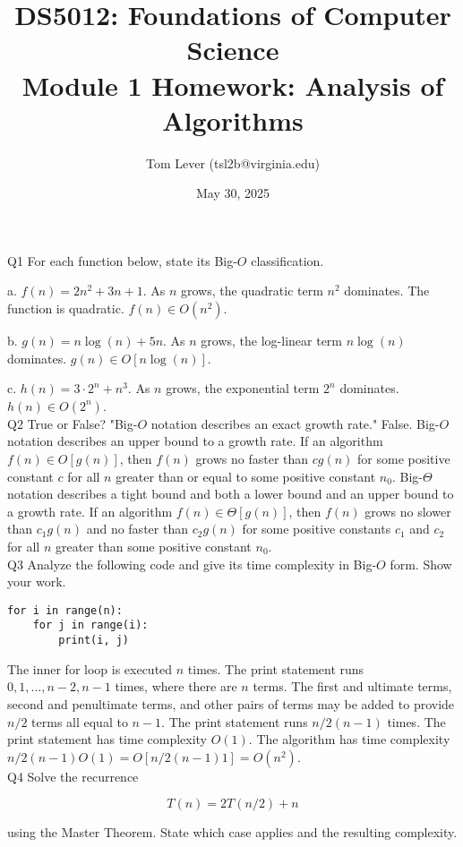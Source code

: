 \documentclass{article}
\title{
DS5012: Foundations of Computer Science\\
\Large Module 1 Homework: Analysis of Algorithms}
\author{Tom Lever (tsl2b@virginia.edu)}
\date{May 30, 2025}
\begin{document}
\maketitle

Q1 For each function below, state its Big-$O$ classification.

a. $f(n) = 2n^2 + 3n + 1$. As $n$ grows, the quadratic term $n^2$ dominates. The function is quadratic. $f(n) \in O(n^2)$.

b. $g(n) = n \log(n) + 5n$. As $n$ grows, the log-linear term $n \log(n)$ dominates. $g(n) \in O[n \log(n)]$.

c. $h(n) = 3 \cdot 2^n + n^3$. As $n$ grows, the exponential term $2^n$ dominates. $h(n) \in O\left(2^n\right)$.\\

Q2 True or False? "Big-$O$ notation describes an exact growth rate." False. Big-$O$ notation describes an upper bound to a growth rate. If an algorithm $f(n) \in O[g(n)]$, then $f(n)$ grows no faster than $cg(n)$ for some positive constant $c$ for all $n$ greater than or equal to some positive constant $n_0$. Big-$\Theta$ notation describes a tight bound and both a lower bound and an upper bound to a growth rate. If an algorithm $f(n) \in \Theta[g(n)]$, then $f(n)$ grows no slower than $c_1 g(n)$ and no faster than $c_2 g(n)$ for some positive constants $c_1$ and $c_2$ for all $n$ greater than some positive constant $n_0$.\\

Q3 Analyze the following code and give its time complexity in Big-$O$ form. Show your work.

\begin{verbatim}
for i in range(n):
    for j in range(i):
        print(i, j)
\end{verbatim}

The inner for loop is executed $n$ times. The print statement runs $0, 1, ..., n - 2, n - 1$ times, where there are $n$ terms. The first and ultimate terms, second and penultimate terms, and other pairs of terms may be added to provide $n/2$ terms all equal to $n - 1$. The print statement runs $n/2 (n-1)$ times. The print statement has time complexity $O(1)$. The algorithm has time complexity $n/2 (n-1) O(1) = O[n/2(n-1)1] = O(n^2)$.\\ 

Q4 Solve the recurrence

$$T(n) = 2T(n/2) + n$$

using the Master Theorem. State which case applies and the resulting complexity.\\
\end{document}
